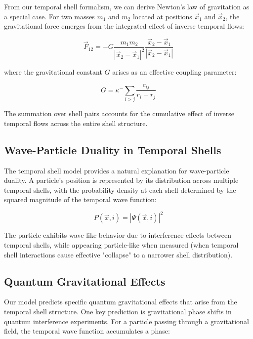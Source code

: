 \documentclass[12pt,a4paper]{article}
\begin{document}
From our temporal shell formalism, we can derive Newton's law of gravitation as a special case. For two masses $m_1$ and $m_2$ located at positions $\vec{x}_1$ and $\vec{x}_2$, the gravitational force emerges from the integrated effect of inverse temporal flows:

\begin{equation}
\vec{F}_{12} = -G \frac{m_1 m_2}{|\vec{x}_2 - \vec{x}_1|^2} \frac{\vec{x}_2 - \vec{x}_1}{|\vec{x}_2 - \vec{x}_1|}
\end{equation}

where the gravitational constant $G$ arises as an effective coupling parameter:

\begin{equation}
G = \kappa^- \sum_{i>j} \frac{c_{ij}}{r_i - r_j}
\end{equation}

The summation over shell pairs accounts for the cumulative effect of inverse temporal flows across the entire shell structure.

\subsection{Wave-Particle Duality in Temporal Shells}

The temporal shell model provides a natural explanation for wave-particle duality. A particle's position is represented by its distribution across multiple temporal shells, with the probability density at each shell determined by the squared magnitude of the temporal wave function:

\begin{equation}
P(\vec{x}, i) = |\Psi(\vec{x}, i)|^2
\end{equation}

The particle exhibits wave-like behavior due to interference effects between temporal shells, while appearing particle-like when measured (when temporal shell interactions cause effective "collapse" to a narrower shell distribution).

\subsection{Quantum Gravitational Effects}

Our model predicts specific quantum gravitational effects that arise from the temporal shell structure. One key prediction is gravitational phase shifts in quantum interference experiments. For a particle passing through a gravitational field, the temporal wave function accumulates a phase:
\end{document}
